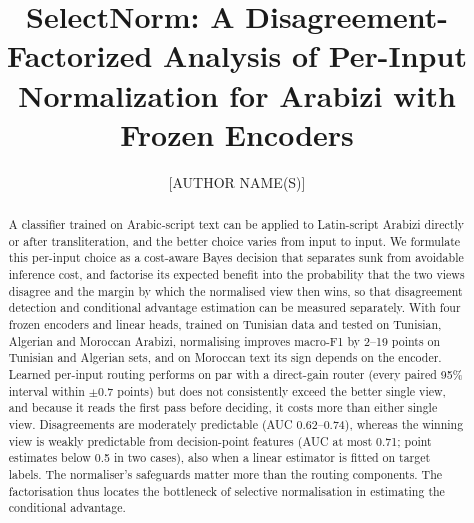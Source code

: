 \documentclass[runningheads]{llncs}
\begin{document}
%
\title{SelectNorm: A Disagreement-Factorized Analysis of Per-Input Normalization for Arabizi with Frozen Encoders}
%
\author{[AUTHOR NAME(S)]\orcidID{[ORCID]}}
\authorrunning{[AUTHOR(S)]}
%
\maketitle
%
\begin{abstract}
A classifier trained on Arabic-script text can be applied to Latin-script Arabizi directly or after transliteration, and the better choice varies from input to input. We formulate this per-input choice as a cost-aware Bayes decision that separates sunk from avoidable inference cost, and factorise its expected benefit into the probability that the two views disagree and the margin by which the normalised view then wins, so that disagreement detection and conditional advantage estimation can be measured separately. With four frozen encoders and linear heads, trained on Tunisian data and tested on Tunisian, Algerian and Moroccan Arabizi, normalising improves macro-F1 by 2--19 points on Tunisian and Algerian sets, and on Moroccan text its sign depends on the encoder. Learned per-input routing performs on par with a direct-gain router (every paired 95\% interval within $\pm0.7$ points) but does not consistently exceed the better single view, and because it reads the first pass before deciding, it costs more than either single view. Disagreements are moderately predictable (AUC 0.62--0.74), whereas the winning view is weakly predictable from decision-point features (AUC at most 0.71; point estimates below 0.5 in two cases), also when a linear estimator is fitted on target labels. The normaliser's safeguards matter more than the routing components. The factorisation thus locates the bottleneck of selective normalisation in estimating the conditional advantage.

\end{abstract}
%








%


%
\appendix

\end{document}
